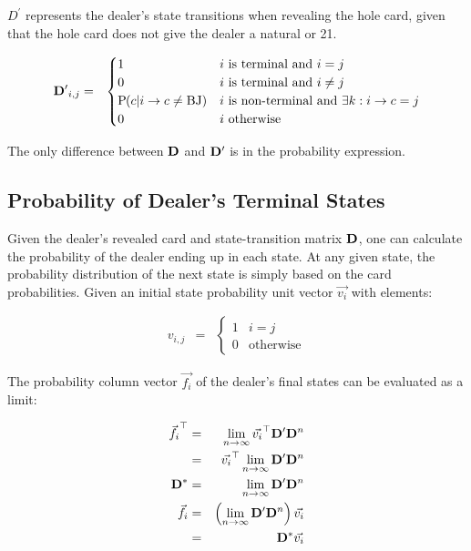 $D^\prime$ represents the dealer's state transitions
when revealing the hole card,
given that the hole card does not give the dealer a natural or 21.

\begin{eqnarray}
\mathbf{D^\prime}_{i,j} &=&
\begin{cases}
1 & i~\text{is terminal and } i=j \\
0 & i~\text{is terminal and } i\neq{}j \\
\textrm{P}\hspace{-.5ex}\left(c|i\rightarrow{}c\neq{}\text{BJ}\right) &
  i~\text{is non-terminal and } \exists k : i\rightarrow{}c = j \\
0 & i~\text{otherwise}
\end{cases}
\end{eqnarray}

\noindent
The only difference between $\mathbf{D}$ and $\mathbf{D^\prime}$
is in the probability expression.  


\subsection{Probability of Dealer's Terminal States}
\label{sec:rules:dealer-play:final-pdf}

Given the dealer's revealed card and state-transition matrix $\mathbf{D}$, 
one can calculate the probability of the dealer ending up in each state.
At any given state, the probability distribution of the
next state is simply based on the card probabilities.  
Given an initial state probability unit vector $\Vec{v_i}$ with elements:

\begin{eqnarray}
v_{i,j} &=& 
\begin{cases}
1 & i=j \\
0 & \text{otherwise}
\end{cases}
\end{eqnarray}

\noindent
The probability column vector $\Vec{f_i}$ of the dealer's final states 
can be evaluated as a limit:

\begin{eqnarray}
\vec{f_i}^{\top} &=& \lim_{n\rightarrow{}\infty}{\vec{v_i}^{\top}\mathbf{D^\prime}\mathbf{D}^n} \nonumber \\
&=& \vec{v_i}^{\top} \lim_{n\rightarrow{}\infty}{\mathbf{D^\prime}\mathbf{D}^n} \\
\mathbf{D^*} &=& \lim_{n\rightarrow{}\infty}{\mathbf{D^\prime}\mathbf{D}^n} \\
\vec{f_i} &=& \left(\lim_{n\rightarrow{}\infty}{\mathbf{D^\prime}\mathbf{D}^n}\right) \vec{v_i} \nonumber \\
&=& \mathbf{D^*} \vec{v_i}
\end{eqnarray}

